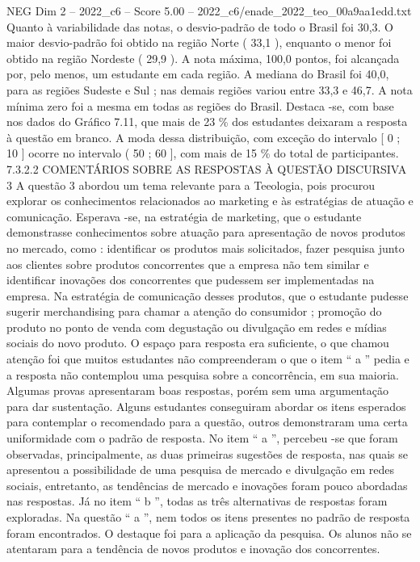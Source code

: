 \begin{textsample}{NEG Dim 2 – 2022\_c6 – Score 5.00 – 2022\_c6/enade\_2022\_teo\_00a9aa1edd.txt}
Quanto à variabilidade das notas, o desvio-padrão de todo o Brasil foi 30,3.
O maior desvio-padrão foi obtido na região Norte ( 33,1 ), enquanto o menor foi obtido na região Nordeste ( 29,9 ).
A nota máxima, 100,0 pontos, foi alcançada por, pelo menos, um estudante em cada região.
A mediana do Brasil foi 40,0, para as regiões Sudeste e Sul ; nas demais regiões variou entre 33,3 e 46,7.
A nota mínima zero foi a mesma em todas as regiões do Brasil.
Destaca -se, com base nos dados do Gráfico 7.11, que mais de 23 \% dos estudantes deixaram a resposta à questão em branco.
A moda dessa distribuição, com exceção do intervalo [ 0 ; 10 ] ocorre no intervalo ( 50 ; 60 ], com mais de 15 \% do total de participantes. 7.3.2.2 COMENTÁRIOS SOBRE AS RESPOSTAS À QUESTÃO DISCURSIVA 3 A questão 3 abordou um tema relevante para a Teeologia, pois procurou explorar os conhecimentos relacionados ao marketing e às estratégias de atuação e comunicação.
Esperava -se, na estratégia de marketing, que o estudante demonstrasse conhecimentos sobre atuação para apresentação de novos produtos no mercado, como : identificar os produtos mais solicitados, fazer pesquisa junto aos clientes sobre produtos concorrentes que a empresa não tem similar e identificar inovações dos concorrentes que pudessem ser implementadas na empresa.
Na estratégia de comunicação desses produtos, que o estudante pudesse sugerir merchandising para chamar a atenção do consumidor ; promoção do produto no ponto de venda com degustação ou divulgação em redes e mídias sociais do novo produto.
O espaço para resposta era suficiente, o que chamou atenção foi que muitos estudantes não compreenderam o que o item “ a ” pedia e a resposta não contemplou uma pesquisa sobre a concorrência, em sua maioria.
Algumas provas apresentaram boas respostas, porém sem uma argumentação para dar sustentação.
Alguns estudantes conseguiram abordar os itens esperados para contemplar o recomendado para a questão, outros demonstraram uma certa uniformidade com o padrão de resposta.
No item “ a ”, percebeu -se que foram observadas, principalmente, as duas primeiras sugestões de resposta, nas quais se apresentou a possibilidade de uma pesquisa de mercado e divulgação em redes sociais, entretanto, as tendências de mercado e inovações foram pouco abordadas nas respostas.
Já no item “ b ”, todas as três alternativas de respostas foram exploradas.
Na questão “ a ”, nem todos os itens presentes no padrão de resposta foram encontrados.
O destaque foi para a aplicação da pesquisa.
Os alunos não se atentaram para a tendência de novos produtos e inovação dos concorrentes.

\end{textsample}
